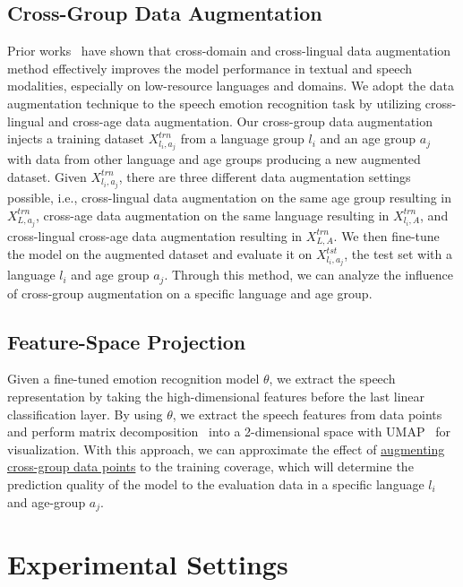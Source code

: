 \documentclass{INTERSPEECH2023}
\newcommand{\ulcolor}[2][]{\setulcolor{#1}\ul{#2}}
\begin{document}
\subsection{Cross-Group Data Augmentation}
\label{sec:cross-group-da}

Prior works~\cite{huang2018auggan,singh2019xlda} have shown that cross-domain and cross-lingual data augmentation method effectively improves the model performance in textual and speech modalities, especially on low-resource languages and domains. We adopt the data augmentation technique to the speech emotion recognition task by utilizing cross-lingual and cross-age data augmentation. Our cross-group data augmentation injects a training dataset $X^{trn}_{l_i, a_j}$ from a language group $l_i$ and an age group $a_j$ with data from other language and age groups producing a new augmented dataset. Given $X^{trn}_{l_i, a_j}$, there are three different data augmentation settings possible, i.e., cross-lingual data augmentation on the same age group resulting in $X^{trn}_{L,a_j}$, cross-age data augmentation on the same language resulting in $X^{trn}_{l_i,A}$, and cross-lingual cross-age data augmentation resulting in $X^{trn}_{L,A}$. We then fine-tune the model on the augmented dataset and evaluate it on $X^{tst}_{l_i, a_j}$, the test set with a language $l_i$ and age group $a_j$. Through this method, we can analyze the influence of cross-group augmentation on a specific language and age group.

\subsection{Feature-Space Projection}
\label{sec:feature-projection}

Given a fine-tuned emotion recognition model $\theta$, we extract the speech representation by taking the high-dimensional features before the last linear classification layer. By using $\theta$, we extract the speech features from data points and perform matrix decomposition~\cite{jolliffe1986pca,hyvarinen2000ica,halko2011md,lovenia2019td,winata2020lr,cahyawijaya2021greenformer,cahyawijaya2021greenformers} into a 2-dimensional space with UMAP~\cite{mcinnes2018umap-software} for visualization. With this approach, we can approximate the effect of \ulcolor[darkgreen]{augmenting cross-group data points} to the training coverage, which will determine the prediction quality of the model to the evaluation data in a specific language $l_i$ and age-group $a_j$.

\section{Experimental Settings}
\end{document}
